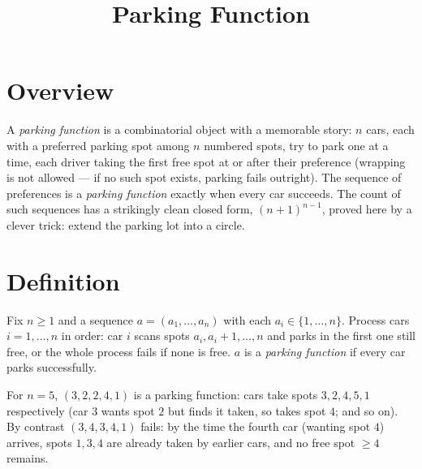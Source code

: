 \documentclass[11pt]{article}
\title{Parking Function}
\author{}
\date{}
\begin{document}
\thispagestyle{fancy}


\section{Overview}
A \emph{parking function} is a combinatorial object with a memorable
story: $n$ cars, each with a preferred parking spot among $n$ numbered
spots, try to park one at a time, each driver taking the first free spot
at or after their preference (wrapping is not allowed --- if no such spot
exists, parking fails outright). The sequence of preferences is a
\emph{parking function} exactly when every car succeeds. The count of
such sequences has a strikingly clean closed form, $(n+1)^{n-1}$, proved
here by a clever trick: extend the parking lot into a circle.

\section{Definition}
\begin{definitionbox}
Fix $n \ge 1$ and a sequence $a = (a_1, \ldots, a_n)$ with each
$a_i \in \{1, \ldots, n\}$. Process cars $i = 1, \ldots, n$ in order: car
$i$ scans spots $a_i, a_i+1, \ldots, n$ and parks in the first one still
free, or the whole process fails if none is free. $a$ is a \emph{parking
function} if every car parks successfully.
\end{definitionbox}

\begin{examplebox}
For $n=5$, $(3,2,2,4,1)$ is a parking function: cars take spots
$3,2,4,5,1$ respectively (car $3$ wants spot $2$ but finds it taken, so
takes spot $4$; and so on). By contrast $(3,4,3,4,1)$ fails: by the time
the fourth car (wanting spot $4$) arrives, spots $1,3,4$ are already
taken by earlier cars, and no free spot $\ge 4$ remains.
\end{examplebox}
\end{document}
